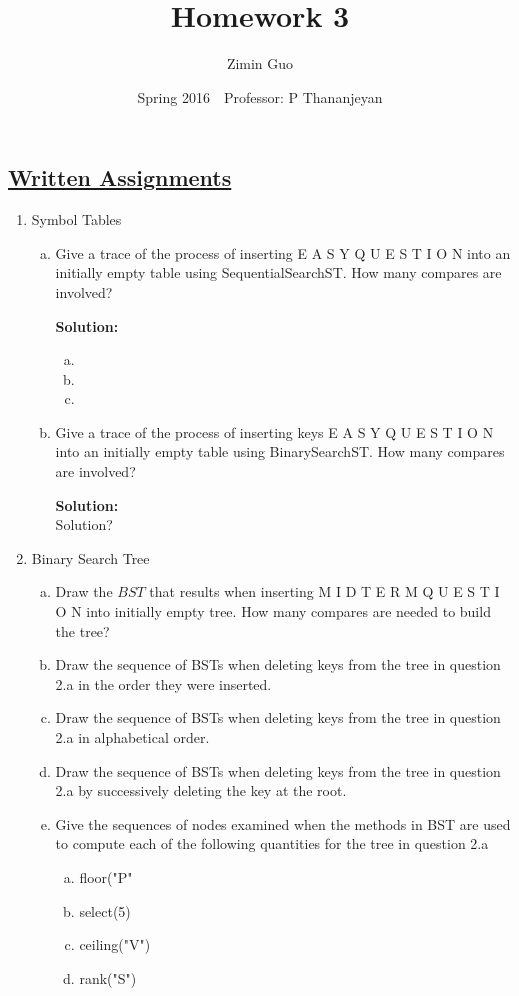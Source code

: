 \documentclass{article}\usepackage{amsmath,amssymb,amsthm,tikz,tkz-graph,color,chngpage,soul,hyperref,csquotes,graphicx,floatrow}\newcommand*{\QEDB}{\hfill\ensuremath{\square}}\newtheorem*{prop}{Proposition}\renewcommand{\theenumi}{\alph{enumi}}\usepackage[shortlabels]{enumitem}\usepackage[nobreak=true]{mdframed}\usetikzlibrary{matrix,calc}\MakeOuterQuote{"}\usepackage[margin=0.75in]{geometry} \newtheorem{theorem}{Theorem}
\title{Homework 3}
\author{Zimin Guo }
\date{Spring 2016$\quad$Professor: P Thananjeyan}
\begin{document}
\maketitle


\subsection*{\underline{Written Assignments}}
\begin{enumerate}[1.]
\item Symbol Tables
\begin{enumerate}[a)]
\item Give a trace of the process of inserting E A S Y Q U E S T I O N into an initially empty table using SequentialSearchST. How many compares are involved?

\begin{mdframed}
\textbf{Solution:}
\begin{enumerate}[a.]
\item
\item
\item
\end{enumerate}
\end{mdframed}

\item Give a trace of the process of inserting keys E A S Y Q U E S T I O N into an initially empty table using BinarySearchST. How many compares are involved?
\begin{mdframed}
\textbf{Solution:} \\
Solution?
\end{mdframed}

\end{enumerate}



\item Binary Search Tree
\begin{enumerate}[a)]
\item Draw the $BST$ that results when inserting M I D T E R M Q U E S T I O N into initially empty tree. How many compares are needed to build the tree?
\item Draw the sequence of BSTs when deleting keys from the tree in question 2.a in the order they were inserted.
\item Draw the sequence of BSTs when deleting keys from the tree in question 2.a in alphabetical order.
\item Draw the sequence of BSTs when deleting keys from the tree in question 2.a by successively deleting the key at the root.
\item Give the sequences of nodes examined when the methods in BST are used to compute each of the following quantities for the tree in question 2.a
\begin{enumerate}[a.]
\item floor("P"
\item select(5)
\item ceiling("V")
\item rank("S")
\end{enumerate}


\end{enumerate}
\end{enumerate}
\end{document}
